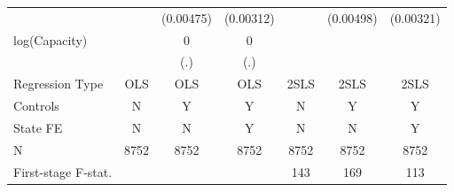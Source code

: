 {\begin{tabular}{l*{6}{c}}
                &                  &(0.00475)         &(0.00312)         &                  &(0.00498)         &(0.00321)         \\
\addlinespace
log(Capacity)   &                  &        0         &        0         &                  &                  &                  \\
                &                  &      (.)         &      (.)         &                  &                  &                  \\
\midrule
Regression Type &      OLS         &      OLS         &      OLS         &     2SLS         &     2SLS         &     2SLS         \\
Controls        &        N         &        Y         &        Y         &        N         &        Y         &        Y         \\
State FE        &        N         &        N         &        Y         &        N         &        N         &        Y         \\
N               &     8752         &     8752         &     8752         &     8752         &     8752         &     8752         \\
First-stage F-stat.&                  &                  &                  &      143         &      169         &      113         \\
\bottomrule
\end{tabular}
}
